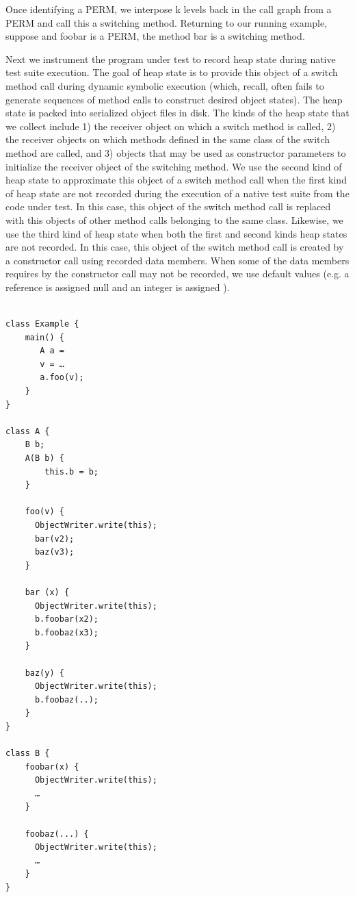 Once identifying a PERM, we interpose k levels back in the call graph from a PERM and call this a switching method.  Returning to our running example, suppose  and foobar is a PERM, the method bar is a switching method.  

Next we instrument the program under test to record heap state during native test suite execution. The goal of heap state is to provide this object of a switch method call during dynamic symbolic execution (which, recall, often fails to generate sequences of method calls to construct desired object states). The heap state is packed into serialized object files in disk. The kinds of the heap state that we collect include 1) the receiver object on which a switch method is called, 2) the receiver objects on which methods defined in the same class of the switch method are called, and 3) objects that may be used as constructor parameters to initialize the receiver object of the switching method. We use the second kind of heap state to approximate this object of a switch method call when the first kind of heap state are not recorded during the execution of a native test suite from the code under test. In this case, this object of the switch method call is replaced with this objects of other method calls belonging to the same class.  Likewise, we use the third kind of heap state when both the first and second kinds heap states are not recorded. In this case, this object of the switch method call is created by a constructor call using recorded data members.  When some of the data members requires by the constructor call may not be recorded, we use default values (e.g. a reference is assigned null and an integer is assigned ).  

\begin{lstlisting}[style=JavaStyle, caption=An example Pig Latin program, label=lst:exampleInstrument, frame=none]

class Example {
	main() {
	   A a = 
	   v = …
	   a.foo(v);
	}
}

class A {
	B b;
	A(B b) {
		this.b = b;
	}

	foo(v) {
	  ObjectWriter.write(this);
	  bar(v2);
	  baz(v3);
	}

	bar (x) {
	  ObjectWriter.write(this);
	  b.foobar(x2);
	  b.foobaz(x3);
	}

	baz(y) {
	  ObjectWriter.write(this);
	  b.foobaz(..);
	}
}

class B {
	foobar(x) {
	  ObjectWriter.write(this);
	  …
	}

	foobaz(...) {
	  ObjectWriter.write(this);
	  …
	}
}
\end{lstlisting}


